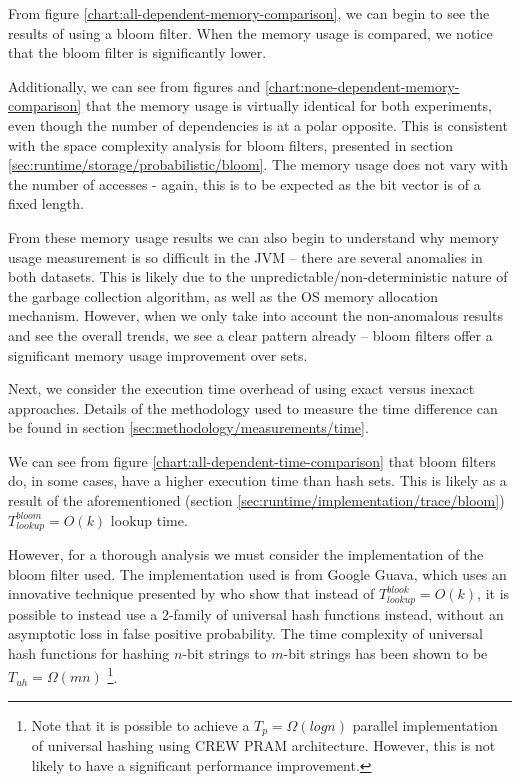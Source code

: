 	From figure \ref{chart:all-dependent-memory-comparison}, we can begin to see the results of using a bloom filter. When the memory usage is compared, we notice that the bloom filter is significantly lower.
	
	Additionally, we can see from figures  and \ref{chart:none-dependent-memory-comparison} that the memory usage is virtually identical for both experiments, even though the number of dependencies is at a polar opposite. This is consistent with the space complexity analysis for bloom filters, presented in section \ref{sec:runtime/storage/probabilistic/bloom}. The memory usage does not vary with the number of accesses - again, this is to be expected as the bit vector is of a fixed length.
	
	From these memory usage results we can also begin to understand why memory usage measurement is so difficult in the JVM -- there are several anomalies in both datasets. This is likely due to the unpredictable/non-deterministic nature of the garbage collection algorithm, as well as the OS memory allocation mechanism. However, when we only take into account the non-anomalous results and see the overall trends, we see a clear pattern already -- bloom filters offer a significant memory usage improvement over sets.
	
	Next, we consider the execution time overhead of using exact versus inexact approaches. Details of the methodology used to measure the time difference can be found in section \ref{sec:methodology/measurements/time}.
	
	We can see from figure \ref{chart:all-dependent-time-comparison} that bloom filters do, in some cases, have a higher execution time than hash sets. This is likely as a result of the aforementioned (section \ref{sec:runtime/implementation/trace/bloom}) $T_{lookup}^{bloom}=O(k)$ lookup time.
	
	However, for a thorough analysis we must consider the implementation of the bloom filter used. The implementation used is from Google Guava, which uses an innovative technique presented by \citet{Azar2006} who show that instead of $T_{lookup}^{blook}=O(k)$, it is possible to instead use a 2-family of universal hash functions instead, without an asymptotic loss in false positive probability. The time complexity of universal hash functions for hashing $n$-bit strings to $m$-bit strings has been shown to be $T_{uh}=\Omega(mn)$ \citep{Mansour1990}\footnote{Note that it is possible to achieve a $T_p=\Omega(log n)$ parallel implementation of universal hashing using CREW PRAM architecture. However, this is not likely to have a significant performance improvement.}.
	
